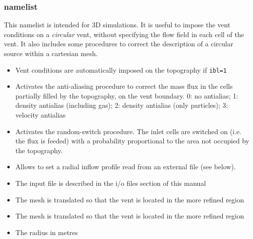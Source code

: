 \subsubsection{ namelist}
This namelist is intended for 3D simulations. It is useful to impose the vent
conditions on a {\em circular} vent, without specifying the flow field in each 
cell of the vent. It also includes some procedures to correct the description
of a circular source within a cartesian mesh.

\begin{itemize}
\item
{}
{Vent conditions are automatically imposed on the topography if {\tt ibl=1}}

\item
{}
{Activates the anti-aliasing procedure to correct the mass flux in the cells
partially filled by the topography, on the vent boundary. 0: no antialias;
1: density antialias (including gas); 2: density antialias (only particles); 
3: velocity antialias}

\item
{}
{Activates the random-switch procedure. The inlet cells are switched on
(i.e. the flux is feeded) with a probability proportional to the area not 
occupied by the topography.}

\item
{}
{Allows to set a radial inflow profile read from an external file (see below).}

\item
{}
{The input file is described in the i/o files section of this manual}

\item
{}
{The mesh is translated so that the vent is located in the more refined region}

\item
{}
{The mesh is translated so that the vent is located in the more refined region}

\item
{}
{The radius in metres}


\end{itemize}
